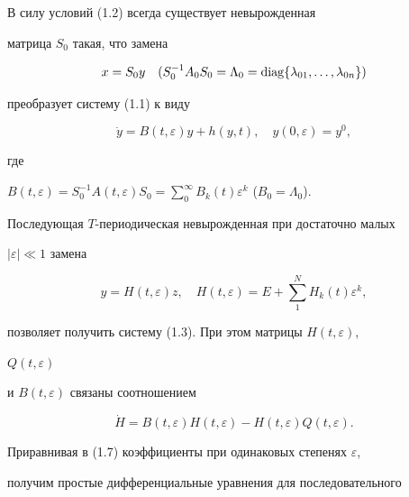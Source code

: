 \begin{pf} 


В силу условий (1.2) всегда существует невырожденная  


матрица $S_0$ такая, что замена 


\begin{equation} 


x=S_0y\quad (S^{-1}_0A_0S_0=\Lambda_0=\diag 


\{\lambda_{01},\dotsc,\lambda_{0n}\}) 


\end{equation} 


преобразует систему (1.1) к виду 


\begin{equation} 


\Dot y=B(t,\varepsilon)y+h(y,t),\quad 


y(0,\varepsilon)=y^0, 


\end{equation} 


где 


$B(t,\varepsilon)=S^{-1}_0A(t,\varepsilon)S_0= 


\sum\limits^\infty_0B_k(t)\varepsilon^k$ ($B_0=\Lambda_0$). 


Последующая $T$-периодическая невырожденная при достаточно малых  


$|\varepsilon|\ll1$ замена 


\begin{equation} 


y=H(t,\varepsilon)z,\quad H(t,\varepsilon)=E+ 


\sum^N_1 H_k(t)\varepsilon^k, 


\end{equation} 


позволяет получить систему (1.3). При этом матрицы $H(t,\varepsilon)$, 


$Q(t,\varepsilon)$ 


и $B(t,\varepsilon)$ связаны соотношением 


\begin{equation} 


\Dot H=B(t,\varepsilon)H(t,\varepsilon)-H(t,\varepsilon) 


Q(t,\varepsilon). 


\end{equation} 


Приравнивая в (1.7) коэффициенты при одинаковых степенях $\varepsilon$, 


получим простые дифференциальные уравнения для последовательного  



\end{pf}
